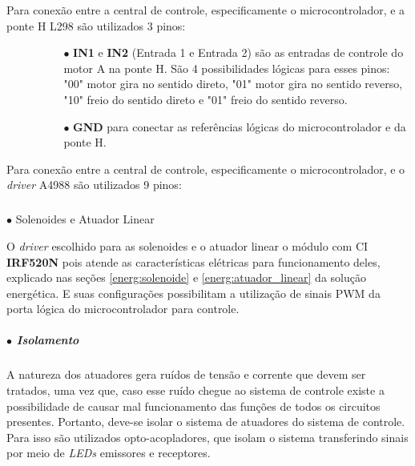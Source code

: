     Para conexão entre a central de controle, especificamente o microcontrolador, e a ponte H L298 são utilizados 3 pinos:
    
    \begin{itemize}
        \item[ ]
        \begin{itemize}
            \item[ ]
            \begin{itemize}
                \item[$\bullet$] \textbf{IN1} e \textbf{IN2} (Entrada 1 e Entrada 2) são as entradas de controle do motor A na ponte H. São 4 possibilidades lógicas para esses pinos: "00" motor gira no sentido direto, "01" motor gira no sentido reverso, "10" freio do sentido direto e "01" freio do sentido reverso.
                \item[$\bullet$] \textbf{GND} para conectar as referências lógicas do microcontrolador e da ponte H.
            \end{itemize}
        \end{itemize}
    \end{itemize}
    
    Para conexão entre a central de controle, especificamente o microcontrolador, e o \textit{driver} A4988 são utilizados 9 pinos:
    
    \subparagraph*{} $\bullet$ Solenoides e Atuador Linear
    
    O \textit{driver} escolhido para as solenoides e o atuador linear o módulo com CI \textbf{IRF520N} pois atende as características elétricas para funcionamento deles, explicado nas seções \ref{energ:solenoide} e \ref{energ:atuador_linear} da solução energética. E suas configurações possibilitam a utilização de sinais PWM da porta lógica do microcontrolador para controle.
    
    
    \subparagraph*{$\bullet$ Isolamento} \hfill
    
    A natureza dos atuadores gera ruídos de tensão e corrente que devem ser tratados, uma vez que, caso esse ruído chegue ao sistema de controle existe a possibilidade de causar mal funcionamento das funções de todos os circuitos presentes. Portanto, deve-se isolar o sistema de atuadores do sistema de controle. Para isso são utilizados opto-acopladores, que isolam o sistema transferindo sinais por meio de \textit{LEDs} emissores e receptores.
    
